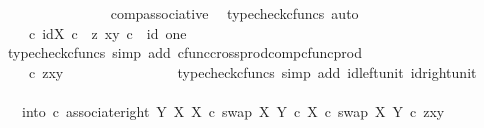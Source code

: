 \begin{isabellebody}
\ \ \ \ \ \ \ \ \ \ \ \ \ \ \isamarkupfalse%
\ comp{\isacharunderscore}{\kern0pt}associative{}\ \isamarkupfalse%
\ {\isacharparenleft}{\kern0pt}typecheck{\isacharunderscore}{\kern0pt}cfuncs{\isacharcomma}{\kern0pt}\ auto{\isacharparenright}{\kern0pt}\isanewline
\ \ \ \ \ \ \ \ \ \ \ \ \isamarkupfalse%
\ \isamarkupfalse%
\ {\isachardoublequoteopen}{\isachardot}{\kern0pt}{\isachardot}{\kern0pt}{\isachardot}{\kern0pt}\ {\isacharequal}{\kern0pt}\ {\isasymTheta}\isactrlsup {\isasymflat}\ {\isasymcirc}\isactrlsub c\ {\isasymlangle}id{\isacharparenleft}{\kern0pt}X{\isacharparenright}{\kern0pt}\ {\isasymcirc}\isactrlsub c\ \ z{\isacharcomma}{\kern0pt}\ {\isasymlangle}x{\isacharcomma}{\kern0pt}y{\isasymrangle}\ {\isasymcirc}\isactrlsub c\ \ id\ one{\isasymrangle}{\isachardoublequoteclose}\isanewline
\ \ \ \ \ \ \ \ \ \ \ \ \ \ \isamarkupfalse%
\ {\isacharparenleft}{\kern0pt}typecheck{\isacharunderscore}{\kern0pt}cfuncs{\isacharcomma}{\kern0pt}\ simp\ add{\isacharcolon}{\kern0pt}\ cfunc{\isacharunderscore}{\kern0pt}cross{\isacharunderscore}{\kern0pt}prod{\isacharunderscore}{\kern0pt}comp{\isacharunderscore}{\kern0pt}cfunc{\isacharunderscore}{\kern0pt}prod{\isacharparenright}{\kern0pt}\isanewline
\ \ \ \ \ \ \ \ \ \ \ \ \isamarkupfalse%
\ \isamarkupfalse%
\ {\isachardoublequoteopen}{\isachardot}{\kern0pt}{\isachardot}{\kern0pt}{\isachardot}{\kern0pt}\ {\isacharequal}{\kern0pt}\ {\isasymTheta}\isactrlsup {\isasymflat}\ {\isasymcirc}\isactrlsub c\ {\isasymlangle}z{\isacharcomma}{\kern0pt}{\isasymlangle}x{\isacharcomma}{\kern0pt}y{\isasymrangle}{\isasymrangle}{\isachardoublequoteclose}\isanewline
\ \ \ \ \ \ \ \ \ \ \ \ \ \ \isamarkupfalse%
\ {\isacharparenleft}{\kern0pt}typecheck{\isacharunderscore}{\kern0pt}cfuncs{\isacharcomma}{\kern0pt}\ simp\ add{\isacharcolon}{\kern0pt}\ id{\isacharunderscore}{\kern0pt}left{\isacharunderscore}{\kern0pt}unit{}\ id{\isacharunderscore}{\kern0pt}right{\isacharunderscore}{\kern0pt}unit{}{\isacharparenright}{\kern0pt}\isanewline
\ \ \ \ \ \ \ \ \ \ \ \ \isamarkupfalse%
\ \isamarkupfalse%
\ {\isachardoublequoteopen}{\isachardot}{\kern0pt}{\isachardot}{\kern0pt}{\isachardot}{\kern0pt}\ {\isacharequal}{\kern0pt}\ {\isacharparenleft}{\kern0pt}{\isacharparenleft}{\kern0pt}into\ {\isasymcirc}\isactrlsub c\ associate{\isacharunderscore}{\kern0pt}right\ Y\ X\ X\ {\isasymcirc}\isactrlsub c\ swap\ X\ {\isacharparenleft}{\kern0pt}Y\ {\isasymtimes}\isactrlsub c\ X{\isacharparenright}{\kern0pt}{\isacharparenright}{\kern0pt}\isactrlsup {\isasymsharp}\ {\isasymcirc}\isactrlsub c\ swap\ X\ Y{\isacharparenright}{\kern0pt}\isactrlsup {\isasymflat}\ {\isasymcirc}\isactrlsub c\ {\isasymlangle}z{\isacharcomma}{\kern0pt}{\isasymlangle}x{\isacharcomma}{\kern0pt}y{\isasymrangle}{\isasymrangle}{\isachardoublequoteclose}\isanewline

\end{isabellebody}
